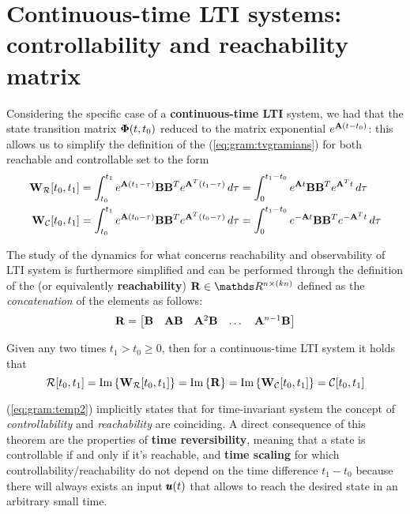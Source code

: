 \section{Continuous-time LTI systems: controllability and reachability matrix}
	Considering the specific case of a \textbf{continuous-time LTI} system, we had that the state transition matrix $\mathbf{\Phi}(t,t_0)$ reduced to the matrix exponential $e^{\mathbf{A} (t-t_0)}$: this allows us to simplify the definition of the  (\ref{eq:gram:tvgramians}) for both reachable and controllable set to the form
	\begin{equation} \begin{split} \label{eq:gram:LTIwr}
		\mathbf{W}_\mathcal R[t_0,t_1] & = \int_{t_0}^{t_1} e^{\mathbf{A}(t_1-\tau)} \mathbf{B}\mathbf{B}^T e^{\mathbf{A}^T(t_1-\tau)} \, d\tau = \int_{0}^{t_1-t_0} e^{\mathbf{A} t} \mathbf{B}\mathbf{B}^T e^{\mathbf{A}^Tt} \, d\tau \\
		\mathbf{W}_\mathcal C[t_0,t_1] & = \int_{t_0}^{t_1} e^{\mathbf{A}(t_0-\tau)} \mathbf{B}\mathbf{B}^T e^{\mathbf{A}^T(t_0-\tau)} \, d\tau = \int_{0}^{t_1-t_0} e^{-\mathbf{A} t} \mathbf{B}\mathbf{B}^T e^{-\mathbf{A}^Tt} \, d\tau 
	\end{split} \end{equation}
	
	The study of the dynamics for what concerns reachability and observability of LTI system is furthermore simplified and can be performed through the definition of the  (or equivalently \textbf{reachability})  $\R \in \mathds R^{n\times (kn)}$ defined as the \textit{concatenation} of the elements as follows:
	\begin{equation} \label{eq:gram:reachabilitymatrix}
		\mathbf{R} = \begin{bmatrix} \mathbf{B} & \mathbf{A}\mathbf{B} & \mathbf{A}^2 \mathbf{B} & \dots & \mathbf{A}^{n-1} \mathbf{B}  \end{bmatrix}
	\end{equation}
	
	\begin{theorem} \label{th:gram:LTIequivalence}
		Given any two times $t_1 > t_0 \geq 0$, then for a continuous-time LTI system it holds that
		\begin{equation} \label{eq:gram:temp2}
			\mathcal R[t_0,t_1] = \textrm{Im}\left\{\mathbf{W}_\mathcal R[t_0,t_1]\right\} = \textrm{Im}\left\{\mathbf{R}\right\} = \textrm{Im}\left\{\mathbf{W}_\mathcal C[t_0,t_1]\right\} = \mathcal C[t_0,t_1]
		\end{equation}
	\end{theorem}
	(\ref{eq:gram:temp2}) implicitly states that for time-invariant system the concept of \textit{controllability} and \textit{reachability} are coinciding. A direct consequence of this theorem are the properties of \textbf{time reversibility}, meaning that a state is controllable if and only if it's reachable, and \textbf{time scaling} for which controllability/reachability do not depend on the time difference $t_1-t_0$ because there will always exists an input $\pmb{u}(t)$ that allows to reach the desired state in an arbitrary small time.
	
